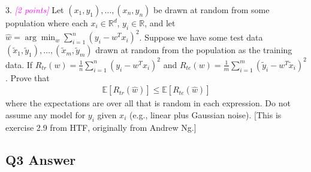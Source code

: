 \documentclass{article}
\newcommand{\1}{\mathbf{1}}
\def\E{\mathbb{E}}
\def\R{\mathbb{R}}
\newcommand{\grade}[1]{\small\textcolor{magenta}{\emph{[#1 points]}} \normalsize}
\begin{document}
3. \grade{2} Let $(x_1,y_1),\dots,(x_n,y_n)$ be drawn at random from some population where each $x_i \in \R^d$, $y_i \in \R$, and let $\widehat{w} = \arg\min_w \sum_{i=1}^n (y_i - w^T x_i)^2$.
Suppose we have some test data $(\widetilde{x}_1,\widetilde{y}_1),\dots,(\widetilde{x}_m,\widetilde{y}_m)$ drawn at random from the population as the training data. 
If $R_{tr}(w) = \frac{1}{n} \sum_{i=1}^n (y_i - w^T x_i)^2$ and $R_{te}(w) = \frac{1}{m} \sum_{i=1}^m (\widetilde{y}_i - w^T \widetilde{x}_i)^2$. Prove that 
\begin{align*}
\E[ R_{tr}(\widehat{w}) ] \leq \E[ R_{te}(\widehat{w}) ]
\end{align*}
where the expectations are over all that is random in each expression. Do not assume any model for $y_i$ given $x_i$ (e.g., linear plus Gaussian noise). [This is exercise 2.9 from HTF, originally from Andrew Ng.]\\


\subsection{Q3 Answer}
\end{document}

